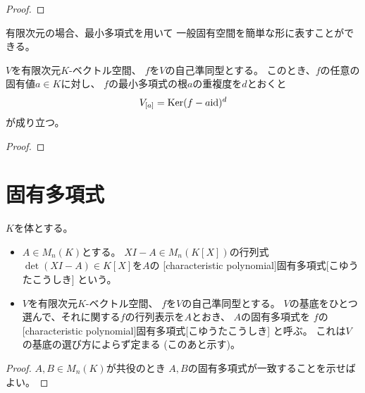 \documentclass[report]{jlreq}
\begin{document}
\begin{proof}
    \TODO{}
\end{proof}

有限次元の場合、最小多項式を用いて
一般固有空間を簡単な形に表すことができる。

\begin{proposition}[最小多項式の根の重複度と一般固有空間]
    $V$を有限次元$K$-ベクトル空間、
    $f$を$V$の自己準同型とする。
    このとき、$f$の任意の固有値$a \in K$に対し、
    $f$の最小多項式の根$a$の重複度を$d$とおくと
    \begin{equation}
        V_{[a]} = \operatorname{\mathrm{Ker}} (f - a\mathrm{id})^d
    \end{equation}
    が成り立つ。
\end{proposition}

\begin{proof}
    \TODO{}
\end{proof}

%
\section{固有多項式}

\begin{definition}[固有多項式]
    $K$を体とする。
    \begin{itemize}
        \item $A \in M_n(K)$とする。
            $XI - A \in M_n(K[X])$の行列式
            $\det (XI - A) \in K[X]$を$A$の
            [characteristic polynomial]{固有多項式}[こゆうたこうしき]
            という。
        \item $V$を有限次元$K$-ベクトル空間、
            $f$を$V$の自己準同型とする。
            $V$の基底をひとつ選んで、それに関する$f$の行列表示を$A$とおき、
            $A$の固有多項式を
            $f$の[characteristic polynomial]{固有多項式}[こゆうたこうしき]
            と呼ぶ。
            これは$V$の基底の選び方によらず定まる (このあと示す)。
    \end{itemize}
\end{definition}

\begin{proof}
    $A, B \in M_n(K)$が共役のとき
    $A, B$の固有多項式が一致することを示せばよい。
    \TODO{}
\end{proof}
\end{document}
